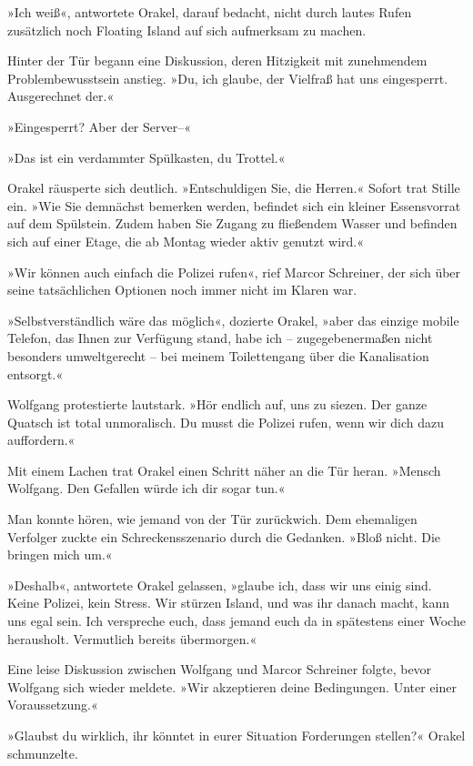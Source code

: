 »Ich weiß«, antwortete Orakel, darauf bedacht, nicht durch lautes Rufen zusätzlich noch Floating Island auf sich aufmerksam zu machen.

Hinter der Tür begann eine Diskussion, deren Hitzigkeit mit zunehmendem Problembewusstsein anstieg. »Du, ich glaube, der Vielfraß hat uns eingesperrt. Ausgerechnet der.«

»Eingesperrt? Aber der Server–«

»Das ist ein verdammter Spülkasten, du Trottel.«

Orakel räusperte sich deutlich. »Entschuldigen Sie, die Herren.« Sofort trat Stille ein. »Wie Sie demnächst bemerken werden, befindet sich ein kleiner Essensvorrat auf dem Spülstein. Zudem haben Sie Zugang zu fließendem Wasser und befinden sich auf einer Etage, die ab Montag wieder aktiv genutzt wird.«

»Wir können auch einfach die Polizei rufen«, rief Marcor Schreiner, der sich über seine tatsächlichen Optionen noch immer nicht im Klaren war.

»Selbstverständlich wäre das möglich«, dozierte Orakel, »aber das einzige mobile Telefon, das Ihnen zur Verfügung stand, habe ich – zugegebenermaßen nicht besonders umweltgerecht – bei meinem Toilettengang über die Kanalisation entsorgt.«

Wolfgang protestierte lautstark. »Hör endlich auf, uns zu siezen. Der ganze Quatsch ist total unmoralisch. Du musst die Polizei rufen, wenn wir dich dazu auffordern.«

Mit einem Lachen trat Orakel einen Schritt näher an die Tür heran. »Mensch Wolfgang. Den Gefallen würde ich dir sogar tun.«

Man konnte hören, wie jemand von der Tür zurückwich. Dem ehemaligen Verfolger zuckte ein Schreckensszenario durch die Gedanken. »Bloß nicht. Die bringen mich um.«

»Deshalb«, antwortete Orakel gelassen, »glaube ich, dass wir uns einig sind. Keine Polizei, kein Stress. Wir stürzen Island, und was ihr danach macht, kann uns egal sein. Ich verspreche euch, dass jemand euch da in spätestens einer Woche herausholt. Vermutlich bereits übermorgen.«

Eine leise Diskussion zwischen Wolfgang und Marcor Schreiner folgte, bevor Wolfgang sich wieder meldete. »Wir akzeptieren deine Bedingungen. Unter einer Voraussetzung.«

»Glaubst du wirklich, ihr könntet in eurer Situation Forderungen stellen?« Orakel schmunzelte.

